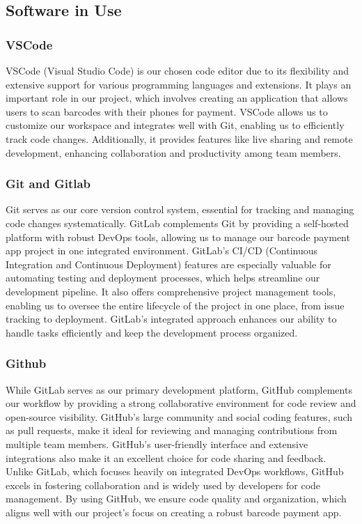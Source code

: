 \documentclass[conference]{IEEEtran}
\begin{document}
\subsection{Software in Use}
\subsubsection{VSCode}
VSCode (Visual Studio Code) is our chosen code editor due to its flexibility and extensive support for various programming languages and extensions. It plays an important role in our project, which involves creating an application that allows users to scan barcodes with their phones for payment. VSCode allows us to customize our workspace and integrates well with Git, enabling us to efficiently track code changes. Additionally, it provides features like live sharing and remote development, enhancing collaboration and productivity among team members. 

\subsubsection{Git and Gitlab}
Git serves as our core version control system, essential for tracking and managing code changes systematically. GitLab complements Git by providing a self-hosted platform with robust DevOps tools, allowing us to manage our barcode payment app project in one integrated environment. GitLab’s CI/CD (Continuous Integration and Continuous Deployment) features are especially valuable for automating testing and deployment processes, which helps streamline our development pipeline. It also offers comprehensive project management tools, enabling us to oversee the entire lifecycle of the project in one place, from issue tracking to deployment. GitLab’s integrated approach enhances our ability to handle tasks efficiently and keep the development process organized. 

\subsubsection{Github}
While GitLab serves as our primary development platform, GitHub complements our workflow by providing a strong collaborative environment for code review and open-source visibility. GitHub’s large community and social coding features, such as pull requests, make it ideal for reviewing and managing contributions from multiple team members. GitHub's user-friendly interface and extensive integrations also make it an excellent choice for code sharing and feedback. Unlike GitLab, which focuses heavily on integrated DevOps workflows, GitHub excels in fostering collaboration and is widely used by developers for code management. By using GitHub, we ensure code quality and organization, which aligns well with our project’s focus on creating a robust barcode payment app. 
\end{document}
